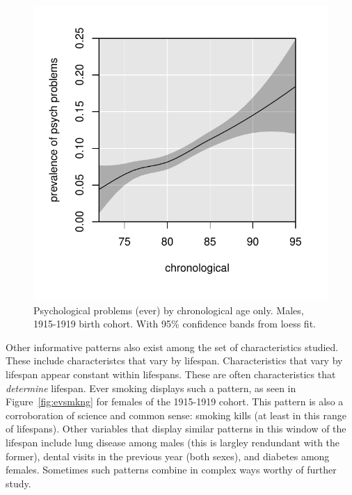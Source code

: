 \documentclass[11pt,oneside,a4paper]{article}
\begin{document}
\begin{figure}[!h]
 \centering
   \caption{Psychological problems (ever) by chronological age only. Males, 1915-1919 birth
    cohort. With 95{\%} confidence bands from loess fit.}
    \label{fig:chronofalse}
   \includegraphics[scale=.7]{Figures/MalePsychChrono.pdf}
\end{figure}

Other informative patterns also exist among the set of characteristics studied.
These include characteristcs that vary by lifespan. Characteristics that vary by
lifespan appear constant within lifespans. These are often characteristics that
\textit{determine} lifespan. Ever smoking displays such a pattern, as seen in
Figure~\ref{fig:evsmkng} for females of the 1915-1919 cohort. This pattern is
also a corroboration of science and common sense: smoking kills (at least in
this range of lifespans). Other variables that display similar patterns in this
window of the lifespan include lung disease among males (this is largley
rendundant with the former), dental visits in the previous year (both sexes),
and diabetes among females. Sometimes such patterns combine in complex ways
worthy of further study.
\end{document}
